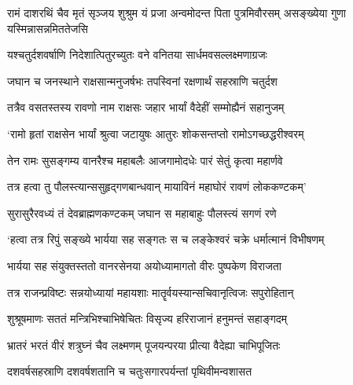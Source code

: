 
\translink{}

\storymeta



\threelineshloka
{रामं दाशरथिं चैव मृतं सृञ्जय शुश्रुम}
{यं प्रजा अन्वमोदन्त पिता पुत्रमिवौरसम्}
{असङ्ख्येया गुणा यस्मिन्नासन्नमिततेजसि}


\twolineshloka
{यश्चतुर्दशवर्षाणि निदेशात्पितुरच्युतः}
{वने वनितया सार्धमवसल्लक्ष्मणाग्रजः}


\twolineshloka
{जघान च जनस्थाने राक्षसान्मनुजर्षभः}
{तपस्विनां रक्षणार्थं सहस्राणि चतुर्दश}


\twolineshloka
{तत्रैव वसतस्तस्य रावणो नाम राक्षसः}
{जहार भार्यां वैदेहीं सम्मोह्यैनं सहानुजम्}


\twolineshloka
{`रामो हृतां राक्षसेन भार्यां श्रुत्वा जटायुषः}
{आतुरः शोकसन्तप्तो रामोऽगच्छद्धरीश्वरम्}


\twolineshloka
{तेन रामः सुसङ्गम्य वानरैश्च महाबलैः}
{आजगामोदधेः पारं सेतुं कृत्वा महार्णवे}


\twolineshloka
{तत्र हत्वा तु पौलस्त्यान्ससुहृद्गणबान्धवान्}
{मायाविनं महाघोरं रावणं लोककण्टकम्'}


\twolineshloka
{सुरासुरैरवध्यं तं देवब्राह्मणकण्टकम्}
{जघान स महाबाहुः पौलस्त्यं सगणं रणे}


\twolineshloka
{`हत्वा तत्र रिपुं सङ्ख्ये भार्यया सह सङ्गतः}
{स च लङ्केश्वरं चक्रे धर्मात्मानं विभीषणम्}


\twolineshloka
{भार्यया सह संयुक्तस्ततो वानरसेनया}
{अयोध्यामागतो वीरः पुष्पकेण विराजता}


\twolineshloka
{तत्र राजन्प्रविष्टः सन्नयोध्यायां महायशाः}
{मातॄर्वयस्यान्सचिवानृत्विजः सपुरोहितान्}


\twolineshloka
{शुश्रूषमाणः सततं मन्त्रिभिश्चाभिषेचितः}
{विसृज्य हरिराजानं हनुमन्तं सहाङ्गदम्}


\twolineshloka
{भ्रातरं भरतं वीरं शत्रुघ्नं चैव लक्ष्मणम्}
{पूजयन्परया प्रीत्या वैदेह्या चाभिपूजितः}


\twolineshloka
{दशवर्षसहस्राणि दशवर्षशतानि च}
{चतुःसगारपर्यन्तां पृथिवीमन्वशासत}


